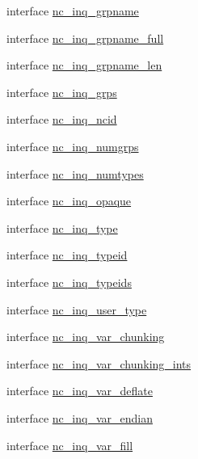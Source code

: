 \begin{DoxyCompactItemize}
\item 
interface \hyperlink{interfacenetcdf4__nc__interfaces_1_1nc__inq__grpname}{nc\+\_\+inq\+\_\+grpname}
\item 
interface \hyperlink{interfacenetcdf4__nc__interfaces_1_1nc__inq__grpname__full}{nc\+\_\+inq\+\_\+grpname\+\_\+full}
\item 
interface \hyperlink{interfacenetcdf4__nc__interfaces_1_1nc__inq__grpname__len}{nc\+\_\+inq\+\_\+grpname\+\_\+len}
\item 
interface \hyperlink{interfacenetcdf4__nc__interfaces_1_1nc__inq__grps}{nc\+\_\+inq\+\_\+grps}
\item 
interface \hyperlink{interfacenetcdf4__nc__interfaces_1_1nc__inq__ncid}{nc\+\_\+inq\+\_\+ncid}
\item 
interface \hyperlink{interfacenetcdf4__nc__interfaces_1_1nc__inq__numgrps}{nc\+\_\+inq\+\_\+numgrps}
\item 
interface \hyperlink{interfacenetcdf4__nc__interfaces_1_1nc__inq__numtypes}{nc\+\_\+inq\+\_\+numtypes}
\item 
interface \hyperlink{interfacenetcdf4__nc__interfaces_1_1nc__inq__opaque}{nc\+\_\+inq\+\_\+opaque}
\item 
interface \hyperlink{interfacenetcdf4__nc__interfaces_1_1nc__inq__type}{nc\+\_\+inq\+\_\+type}
\item 
interface \hyperlink{interfacenetcdf4__nc__interfaces_1_1nc__inq__typeid}{nc\+\_\+inq\+\_\+typeid}
\item 
interface \hyperlink{interfacenetcdf4__nc__interfaces_1_1nc__inq__typeids}{nc\+\_\+inq\+\_\+typeids}
\item 
interface \hyperlink{interfacenetcdf4__nc__interfaces_1_1nc__inq__user__type}{nc\+\_\+inq\+\_\+user\+\_\+type}
\item 
interface \hyperlink{interfacenetcdf4__nc__interfaces_1_1nc__inq__var__chunking}{nc\+\_\+inq\+\_\+var\+\_\+chunking}
\item 
interface \hyperlink{interfacenetcdf4__nc__interfaces_1_1nc__inq__var__chunking__ints}{nc\+\_\+inq\+\_\+var\+\_\+chunking\+\_\+ints}
\item 
interface \hyperlink{interfacenetcdf4__nc__interfaces_1_1nc__inq__var__deflate}{nc\+\_\+inq\+\_\+var\+\_\+deflate}
\item 
interface \hyperlink{interfacenetcdf4__nc__interfaces_1_1nc__inq__var__endian}{nc\+\_\+inq\+\_\+var\+\_\+endian}
\item 
interface \hyperlink{interfacenetcdf4__nc__interfaces_1_1nc__inq__var__fill}{nc\+\_\+inq\+\_\+var\+\_\+fill}

\end{DoxyCompactItemize}
